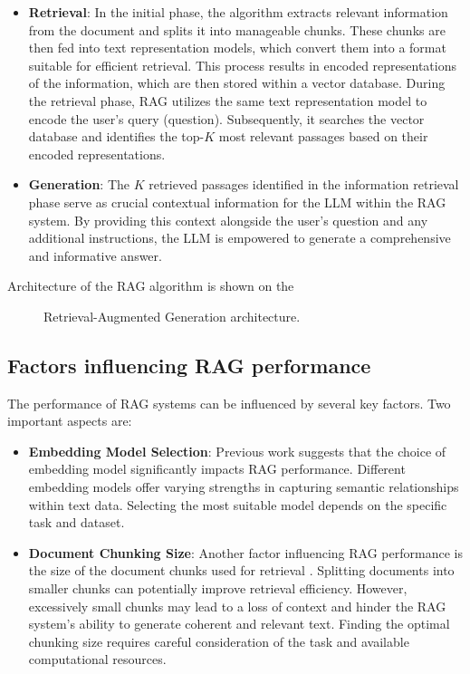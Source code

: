 \begin{itemize}
  \item \textbf{Retrieval}:
    In the initial phase, the algorithm extracts relevant information from the document and splits it into manageable chunks.
    These chunks are then fed into text representation models, which convert them into a format suitable for efficient retrieval.
    This process results in encoded representations of the information, which are then stored within a vector database.
    During the retrieval phase, \ac{RAG} utilizes the same text representation model to encode the user's query (question).
    Subsequently, it searches the vector database and identifies the top-$K$ most relevant passages based on their encoded representations.
  \item \textbf{Generation}:
    The $K$ retrieved passages identified in the information retrieval phase serve as crucial contextual information for the \ac{LLM} within the \ac{RAG} system.
    By providing this context alongside the user's question and any additional instructions, the \ac{LLM} is empowered to generate a comprehensive and informative answer.
\end{itemize}

Architecture of the \ac{RAG} algorithm is shown on the 

\begin{figure}[h]
  \centering
  
  \caption{Retrieval-Augmented Generation architecture.}
  \label{fig:RAG_scheme}
\end{figure}

\subsection{Factors influencing \ac{RAG} performance}
The performance of \ac{RAG} systems can be influenced by several key factors.
Two important aspects are:

\begin{itemize}
    \item \textbf{Embedding Model Selection}:
        Previous work \cite{joshi2024RAGemb} suggests that the choice of embedding model significantly impacts \ac{RAG} performance.
        Different embedding models offer varying strengths in capturing semantic relationships within text data.
        Selecting the most suitable model depends on the specific task and dataset.
    \item \textbf{Document Chunking Size}:
        Another factor influencing \ac{RAG} performance is the size of the document chunks used for retrieval \cite{theja2023RAGchunk}.
        Splitting documents into smaller chunks can potentially improve retrieval efficiency.
        However, excessively small chunks may lead to a loss of context and hinder the \ac{RAG} system's ability to generate coherent and relevant text.
        Finding the optimal chunking size requires careful consideration of the task and available computational resources.    
\end{itemize}




